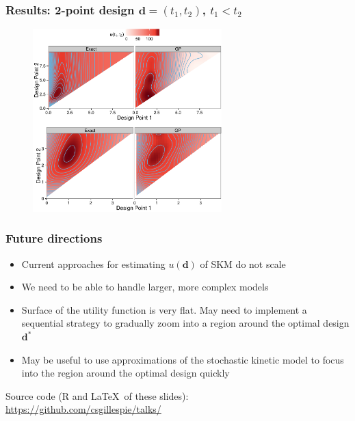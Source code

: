 \documentclass[t,compress]{beamer}
\newcommand{\bd}{\boldsymbol{d}}
\begin{document}
\begin{frame}
\frametitle{Results: 2-point design $\bd = (t_1, t_2)$, $t_1 < t_2$}
\begin{figure}[t]
\includegraphics[width=0.65\textwidth]{figure5-crop.pdf}
\end{figure}

\end{frame}

\begin{frame}
\frametitle{Future directions}

\begin{itemize}
\item Current approaches for estimating $u(\bd)$ of SKM do not scale
\item We need to be able to handle larger, more complex models
\item Surface of the utility function is very flat. May need to implement a
  sequential strategy to  gradually zoom into a region around the optimal design $\bd^*$
\item May be useful to use approximations of the stochastic kinetic model to
  focus into the region around the optimal design quickly
\end{itemize}
{\small
Source code (R and \LaTeX\ of these slides):\\
\alert{\url{https://github.com/csgillespie/talks/}}}

\end{frame}
\end{document}

